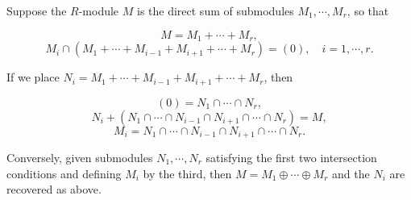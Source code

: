 Suppose the $R$-module $M$ is the direct sum of submodules $M_1, \cdots, M_r$, so that

$$M = M_1 + \cdots + M_r,$$
$$M_i \cap (M_1 + \cdots + M_{i-1} + M_{i+1} + \cdots + M_r) = (0), \quad i = 1, \cdots, r.$$

If we place $N_i = M_1 + \cdots + M_{i-1} + M_{i+1} + \cdots + M_r$, then

$$(0) = N_1 \cap \cdots \cap N_r,$$
$$N_i + (N_1 \cap \cdots \cap N_{i-1} \cap N_{i+1} \cap \cdots \cap N_r) = M,$$
$$M_i = N_1 \cap \cdots \cap N_{i-1} \cap N_{i+1} \cap \cdots \cap N_r.$$

Conversely, given submodules $N_1, \cdots, N_r$ satisfying the first two intersection conditions and defining $M_i$ by the third, then $M = M_1 \oplus \cdots \oplus M_r$ and the $N_i$ are recovered as above.
